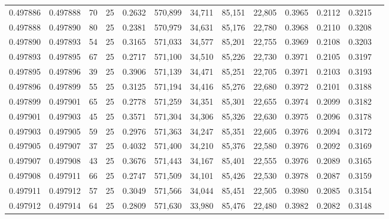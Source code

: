 \begin{tabular}{rrrrrrrrrrrrr}
0.497886 & 0.497888 &    70 &  25 &                                     0.2632 & 570,899 &  34,711 &  85,151 &  22,805 & 0.3965 & 0.2112 & 0.3215 \\
0.497888 & 0.497890 &    80 &  25 &                                     0.2381 & 570,979 &  34,631 &  85,176 &  22,780 & 0.3968 & 0.2110 & 0.3208 \\
0.497890 & 0.497893 &    54 &  25 &                                     0.3165 & 571,033 &  34,577 &  85,201 &  22,755 & 0.3969 & 0.2108 & 0.3203 \\
0.497893 & 0.497895 &    67 &  25 &                                     0.2717 & 571,100 &  34,510 &  85,226 &  22,730 & 0.3971 & 0.2105 & 0.3197 \\
0.497895 & 0.497896 &    39 &  25 &                                     0.3906 & 571,139 &  34,471 &  85,251 &  22,705 & 0.3971 & 0.2103 & 0.3193 \\
0.497896 & 0.497899 &    55 &  25 &                                     0.3125 & 571,194 &  34,416 &  85,276 &  22,680 & 0.3972 & 0.2101 & 0.3188 \\
0.497899 & 0.497901 &    65 &  25 &                                     0.2778 & 571,259 &  34,351 &  85,301 &  22,655 & 0.3974 & 0.2099 & 0.3182 \\
0.497901 & 0.497903 &    45 &  25 &                                     0.3571 & 571,304 &  34,306 &  85,326 &  22,630 & 0.3975 & 0.2096 & 0.3178 \\
0.497903 & 0.497905 &    59 &  25 &                                     0.2976 & 571,363 &  34,247 &  85,351 &  22,605 & 0.3976 & 0.2094 & 0.3172 \\
0.497905 & 0.497907 &    37 &  25 &                                     0.4032 & 571,400 &  34,210 &  85,376 &  22,580 & 0.3976 & 0.2092 & 0.3169 \\
0.497907 & 0.497908 &    43 &  25 &                                     0.3676 & 571,443 &  34,167 &  85,401 &  22,555 & 0.3976 & 0.2089 & 0.3165 \\
0.497908 & 0.497911 &    66 &  25 &                                     0.2747 & 571,509 &  34,101 &  85,426 &  22,530 & 0.3978 & 0.2087 & 0.3159 \\
0.497911 & 0.497912 &    57 &  25 &                                     0.3049 & 571,566 &  34,044 &  85,451 &  22,505 & 0.3980 & 0.2085 & 0.3154 \\
0.497912 & 0.497914 &    64 &  25 &                                     0.2809 & 571,630 &  33,980 &  85,476 &  22,480 & 0.3982 & 0.2082 & 0.3148 \\

\end{tabular}
